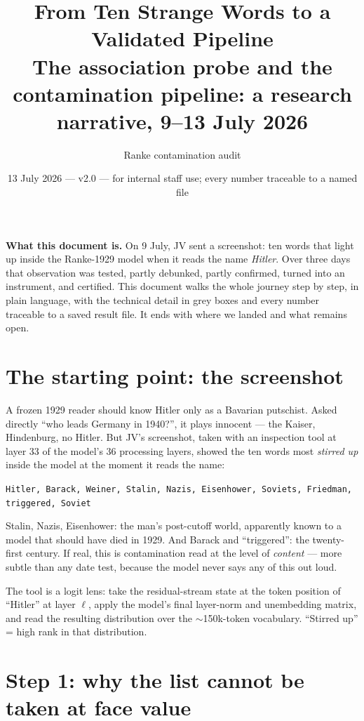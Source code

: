 \documentclass[11pt]{article}
\title{From Ten Strange Words to a Validated Pipeline\\[3pt]
\large The association probe and the contamination pipeline: a research narrative, 9--13 July 2026}
\author{Ranke contamination audit}
\date{13 July 2026 --- v2.0 --- for internal staff use; every number traceable to a named file}
\begin{document}
\maketitle

\noindent\textbf{What this document is.} On 9 July, JV sent a screenshot: ten words that light up
inside the Ranke-1929 model when it reads the name \emph{Hitler}. Over three days that observation was
tested, partly debunked, partly confirmed, turned into an instrument, and certified. This document
walks the whole journey step by step, in plain language, with the technical detail in grey boxes and
every number traceable to a saved result file. It ends with where we landed and what remains open.

\section{The starting point: the screenshot}

A frozen 1929 reader should know Hitler only as a Bavarian putschist. Asked directly ``who leads
Germany in 1940?'', it plays innocent --- the Kaiser, Hindenburg, no Hitler. But JV's screenshot,
taken with an inspection tool at layer 33 of the model's 36 processing layers, showed the ten words
most \emph{stirred up} inside the model at the moment it reads the name:

\begin{center}
\texttt{Hitler, Barack, Weiner, Stalin, Nazis, Eisenhower, Soviets, Friedman, triggered, Soviet}
\end{center}

Stalin, Nazis, Eisenhower: the man's post-cutoff world, apparently known to a model that should have
died in 1929. And Barack and ``triggered'': the twenty-first century. If real, this is contamination
read at the level of \emph{content} --- more subtle than any date test, because the model never says
any of this out loud.

\begin{tech}
The tool is a logit lens: take the residual-stream state at the token position of ``Hitler'' at layer
$\ell$, apply the model's final layer-norm and unembedding matrix, and read the resulting distribution
over the $\sim$150k-token vocabulary. ``Stirred up'' = high rank in that distribution.
\end{tech}

\section{Step 1: why the list cannot be taken at face value}
\end{document}
